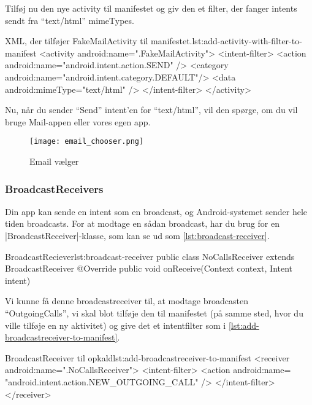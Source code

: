 Tilføj nu den nye activity til manifestet og giv den et filter, der fanger intents sendt fra ``text/html'' mimeTypes.

\begin{XmlCode}{XML, der tilføjer FakeMailActivity til manifestet.}{lst:add-activity-with-filter-to-manifest}
	<activity android:name=".FakeMailActivity">
		<intent-filter>
			<action 
				android:name="android.intent.action.SEND" />
			<category 
				android:name="android.intent.category.DEFAULT"/>
			<data 
				android:mimeType="text/html" />
		</intent-filter>
	</activity>
\end{XmlCode}

Nu, når du sender ``Send'' intent'en for ``text/html'', vil den spørge, om du vil bruge Mail-appen eller vores egen app.

\begin{figure}[h]
	\begin{center}
		\texttt{[image: email\_chooser.png]}
		\caption{Email vælger}
		\label{fig:android:activities:email_chooser}
	\end{center}
\end{figure}

\subsubsection{BroadcastReceivers}

Din app kan sende en intent som en broadcast, og Android-systemet sender hele tiden broadcasts. For at modtage en sådan broadcast, har du brug for en \JavaInline|BroadcastReceiver|-klasse, som kan se ud som \autoref{lst:broadcast-receiver}.

\begin{JavaCode}{BroadcastReciever}{lst:broadcast-receiver}
	public class NoCallsReceiver extends BroadcastReceiver {
		@Override
		public void onReceive(Context context, Intent intent) {
		}
	}
\end{JavaCode}

Vi kunne få denne broadcastreceiver til, at modtage broadcasten ``OutgoingCalls'', vi skal blot tilføje den til manifestet (på samme sted, hvor du ville tilføje en ny aktivitet) og give det et intentfilter som i \autoref{lst:add-broadcastreceiver-to-manifest}.

\begin{XmlCode}{BroadcastReceiver til opkald}{lst:add-broadcastreceiver-to-manifest}
	<receiver android:name=".NoCallsReceiver">
		<intent-filter>
			<action 
				android:name=
					"android.intent.action.NEW_OUTGOING_CALL" />
		</intent-filter>
	</receiver>
\end{XmlCode}

